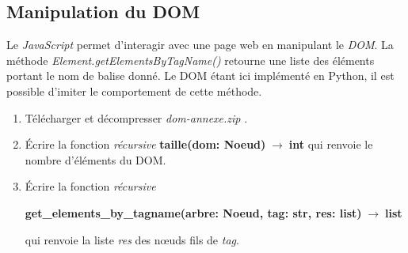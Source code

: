 \documentclass[a4paper,11pt]{article}
\begin{document}
\begin{Form}
\subsection{Manipulation du DOM}
Le \emph{JavaScript} permet d'interagir avec une page web en manipulant le \emph{DOM}. La méthode \emph{Element.getElementsByTagName()} retourne une liste des éléments portant le nom de balise donné. Le DOM étant ici implémenté en Python, il est possible d'imiter le comportement de cette méthode.
\begin{activite}
\begin{enumerate}
\item Télécharger et décompresser \emph{dom-annexe.zip} .
\item Écrire la fonction \emph{récursive} \textbf{taille(dom: Noeud)$\;\rightarrow\;$int} qui renvoie le nombre d'éléments du DOM.
\item Écrire la fonction \emph{récursive}
\begin{center}
\textbf{get\_elements\_by\_tagname(arbre: Noeud, tag: str, res: list)$\;\rightarrow\;$list}
\end{center} qui renvoie la liste \emph{res} des nœuds fils de \emph{tag}.
\end{enumerate}
\end{activite}
\end{Form}
\end{document}

